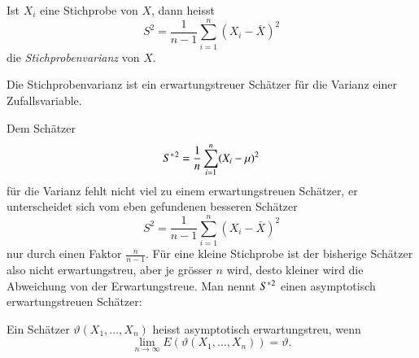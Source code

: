 \begin{definition}
Ist $X_i$ eine Stichprobe von $X$, dann heisst
\begin{equation}
S^2=\frac1{n-1}\sum_{i=1}^n (X_i -\bar X)^2
\end{equation}
die {\em Stichprobenvarianz} von $X$.
\end{definition}

\begin{satz}Die Stichprobenvarianz ist ein erwartungstreuer Schätzer
für die Varianz einer Zufallsvariable.
\end{satz}

Dem Schätzer
\begin{equation}
S^{*}\mathstrut^{2}=\frac1n\sum_{i=1}^n(X_i-\mu)^2
\end{equation}
für die Varianz fehlt nicht viel zu einem erwartungstreuen Schätzer,
er unterscheidet sich vom eben gefundenen besseren Schätzer
\begin{equation}
S^2=\frac1{n-1}\sum_{i=1}^n(X_i-\bar X)^2
\end{equation}
nur durch einen Faktor $\frac{n}{n-1}$.
Für eine kleine Stichprobe ist
der bisherige Schätzer also nicht erwartungstreu, aber je grösser $n$
wird, desto kleiner wird die Abweichung von der Erwartungstreue.
Man
nennt $S^{*}\mathstrut^{2}$ einen asymptotisch erwartungstreuen Schätzer:
\begin{definition}
Ein Schätzer $\vartheta(X_1,\dots,X_n)$ heisst asymptotisch erwartungstreu,
wenn
\begin{equation}
\lim_{n\to\infty}E(\vartheta(X_1,\dots,X_n))=\vartheta.
\end{equation}
\end{definition}

